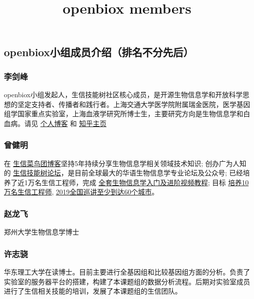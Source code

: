 \documentclass[]{article}
\title{openbiox members}
\author{}
\date{}
\begin{document}
\maketitle

\subsection{openbiox小组成员介绍（排名不分先后）}\label{openbiox}

\subsubsection{李剑峰}

openbiox小组发起人，生信技能树社区核心成员，是开源生物信息学和开放科学思想的坚定支持者、传播者和践行者。上海交通大学医学院附属瑞金医院，医学基因组学国家重点实验室，上海血液学研究所博士生，主要研究方向是生物信息学和白血病。请见
\href{https://life2cloud.com}{个人博客} 和
\href{https://www.zhihu.com/people/life2cloud}{知乎主页}

\subsubsection{曾健明}

在
\href{http://www.bio-info-trainee.com/}{生信菜鸟团博客}坚持5年持续分享生物信息学相关领域技术知识;
创办广为人知的
\href{http://www.biotrainee.com/}{生信技能树论坛}，是目前全球最大的华语生物信息学专业论坛及公众号;
已经培养了近1万名生信工程师，完成
\href{https://space.bilibili.com/338686099}{全套生物信息学入门及进阶视频教程};
目标
\href{https://mp.weixin.qq.com/s/E9ykuIbc-2Ja9HOY0bn_6g}{培养10万名生信工程师},
\href{https://static.dingtalk.com/media/lALPAuoR5z1wDQ3NA_DNAoA_640_1008.png}{2019全国巡讲至少到达60个城市}。

\subsubsection{赵龙飞}

郑州大学生物信息学博士

\subsubsection{许志骁}

华东理工大学在读博士。目前主要进行全基因组和比较基因组方面的分析。负责了实验室的服务器平台的搭建，构建了本课题组的数据分析流程。后期对实验室成员进行了生信相关技能的培训，发展了本课题组的生信团队。
\end{document}
